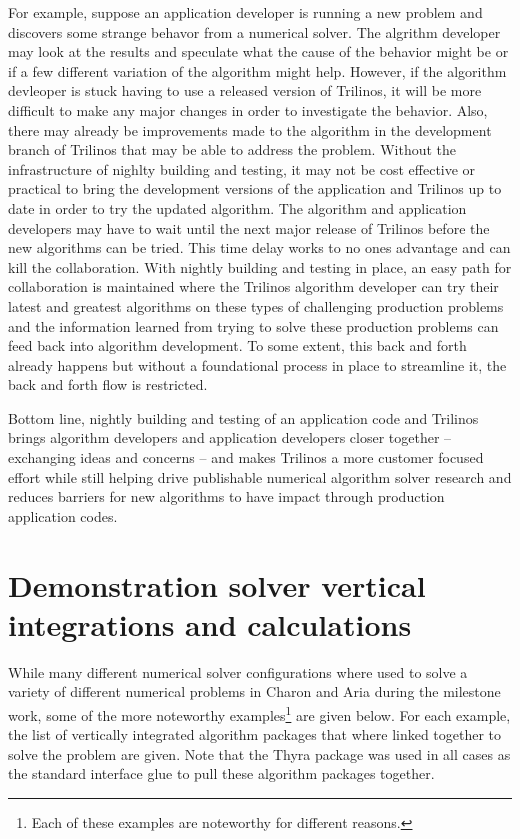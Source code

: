 \documentclass[pdf,ps2pdf,11pt]{SANDreport}
\begin{document}
For example, suppose an application developer is running a new problem and
discovers some strange behavor from a numerical solver.  The algrithm
developer may look at the results and speculate what the cause of the behavior
might be or if a few different variation of the algorithm might help.
However, if the algorithm devleoper is stuck having to use a released version
of Trilinos, it will be more difficult to make any major changes in order to
investigate the behavior.  Also, there may already be improvements made to the
algorithm in the development branch of Trilinos that may be able to address
the problem.  Without the infrastructure of nighlty building and testing, it
may not be cost effective or practical to bring the development versions of
the application and Trilinos up to date in order to try the updated algorithm.
The algorithm and application developers may have to wait until the next major
release of Trilinos before the new algorithms can be tried.  This time delay
works to no ones advantage and can kill the collaboration.  With nightly
building and testing in place, an easy path for collaboration is maintained
where the Trilinos algorithm developer can try their latest and greatest
algorithms on these types of challenging production problems and the
information learned from trying to solve these production problems can feed
back into algorithm development.  To some extent, this back and forth already
happens but without a foundational process in place to streamline it, the back
and forth flow is restricted.

Bottom line, nightly building and testing of an application code and Trilinos
brings algorithm developers and application developers closer together --
exchanging ideas and concerns -- and makes Trilinos a more customer focused
effort while still helping drive publishable numerical algorithm solver
research and reduces barriers for new algorithms to have impact through
production application codes.



%
\section{Demonstration solver vertical integrations and calculations}
\label{sec:demonstration}
%

While many different numerical solver configurations where used to solve a
variety of different numerical problems in Charon and Aria during the
milestone work, some of the more noteworthy examples\footnote{Each of these
examples are noteworthy for different reasons.} are given below.  For each
example, the list of vertically integrated algorithm packages that where
linked together to solve the problem are given.  Note that the Thyra package
was used in all cases as the standard interface glue to pull these algorithm
packages together.
\end{document}

